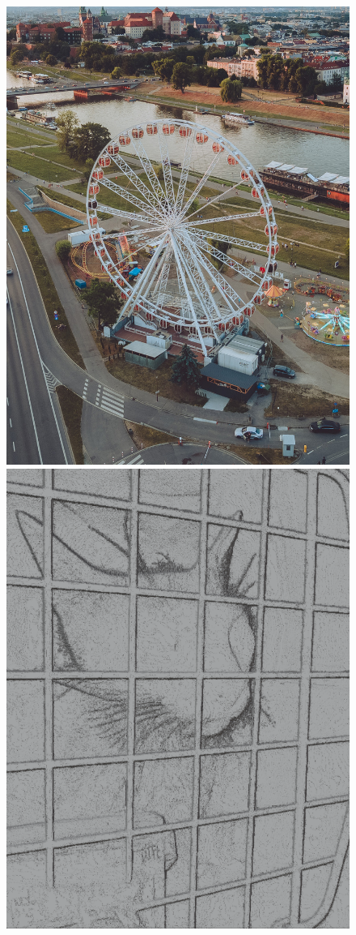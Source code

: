 \documentclass[12pt, letterpaper]{article}
\begin{document}
\begin{figure}[!ht]
\begin{minipage}{0.22\textwidth}
        \includegraphics[width=\textwidth]{example_4}
        \includegraphics[width=\textwidth]{example_6}

\end{minipage}
\end{figure}
\end{document}
